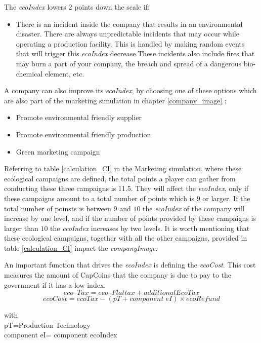 The \textit{ecoIndex} lowers $2$ points down the scale if: 
\begin{itemize}
	\item There is an incident inside the company that results in an environmental disaster. There are always unpredictable incidents that may occur while operating a production facility. This is handled by making random events that will trigger this \textit{ecoIndex} decrease.These incidents also include fires that may burn a part of your company, the breach and spread of a dangerous bio-chemical element, etc.
\end{itemize}

A company can also improve its \textit{ecoIndex}, by choosing one of these options which are also part of the marketing simulation in chapter \ref{company_image} : 

\begin{itemize}
\item Promote environmental friendly supplier
\item Promote environmental friendly production
\item Green marketing campaign
\end{itemize}
Referring to table \ref{calculation_CI} in the Marketing simulation, where these ecological campaigns are defined, the total points a player can gather from conducting these three campaigns is 11.5. They will affect the \textit{ecoIndex}, only if these campaigns amount to a total number of points which is $9$ or larger. If the total number of poinsts is between $9$ and $10$ the \textit{ecoIndex} of the company will increase by one level, and if the number of points provided by these campaigns is larger than $10$ the \textit{ecoIndex} increases by two levels. It is worth mentioning that these ecological campaigns, together with all the other campaigns, provided in table \ref{calculation_CI} impact the \textit{companyImage}.

An important function that drives the \textit{ecoIndex} is defining the \textit{ecoCost}. This cost measures the amount of CapCoins that the company is due to pay to the government if it has a low index. \\ 
\begin{equation}
eco–Tax= eco–Flat tax+ additionalEcoTax
\label{eq:eco-tax}
\end{equation}
\begin{equation}
ecoCost= ecoTax - (pT + component \; eI)\times ecoRefund 
\label{eq:eco-cost}
\end{equation}
\begin{center}
with\\
	pT=Production Technology\\
	component \gls{eI}= component ecoIndex\\
\end{center}

